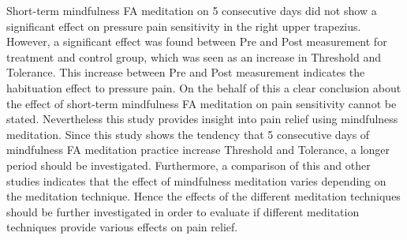 Short-term mindfulness FA meditation on 5 consecutive days did not show a significant effect on pressure pain sensitivity in the right upper trapezius. However, a significant effect was found between Pre and Post measurement for treatment and control group, which was seen as an increase in Threshold and Tolerance. This increase between Pre and Post measurement indicates the habituation effect to pressure pain.
On the behalf of this a clear conclusion about the effect of short-term mindfulness FA meditation on pain sensitivity cannot be stated. Nevertheless this study provides insight into pain relief using mindfulness meditation.
Since this study shows the tendency that 5 consecutive days of mindfulness FA meditation practice increase Threshold and Tolerance, a longer period should be investigated. 
Furthermore, a comparison of this and
other studies indicates that the effect of mindfulness meditation varies depending on the
meditation technique. Hence the effects of the different meditation techniques should be
further investigated in order to evaluate if different meditation techniques provide various
effects on pain relief.

